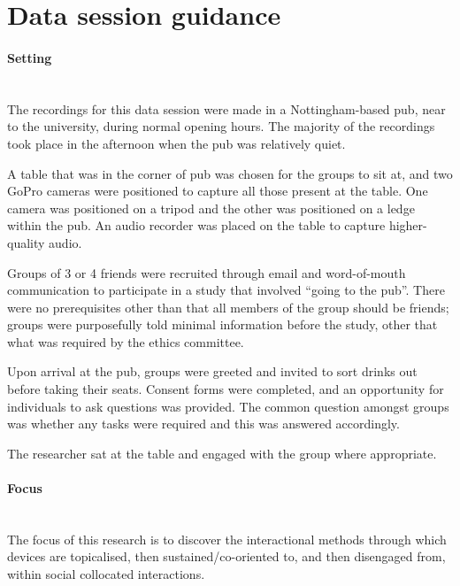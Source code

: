 


\section{Data session guidance}\label{app:studyinfo-pub datasession}






\paragraph{Setting} \hfill \\
The recordings for this data session were made in a Nottingham-based pub, near to the university, during normal opening hours.
The majority of the recordings took place in the afternoon when the pub was relatively quiet.

A table that was in the corner of pub was chosen for the groups to sit at, and two GoPro cameras were positioned to capture all those present at the table.
One camera was positioned on a tripod and the other was positioned on a ledge within the pub.
An audio recorder was placed on the table to capture higher-quality audio.

Groups of 3 or 4 friends were recruited through email and word-of-mouth communication to participate in a study that involved “going to the pub”.
There were no prerequisites other than that all members of the group should be friends; groups were purposefully told minimal information before the study, other that what was required by the ethics committee.

Upon arrival at the pub, groups were greeted and invited to sort drinks out before taking their seats.
Consent forms were completed, and an opportunity for individuals to ask questions was provided.
The common question amongst groups was whether any tasks were required and this was answered accordingly.

The researcher sat at the table and engaged with the group where appropriate.






\paragraph{Focus} \hfill \\
The focus of this research is to discover the interactional methods through which devices are topicalised, then sustained/co-oriented to, and then disengaged from, within social collocated interactions.



